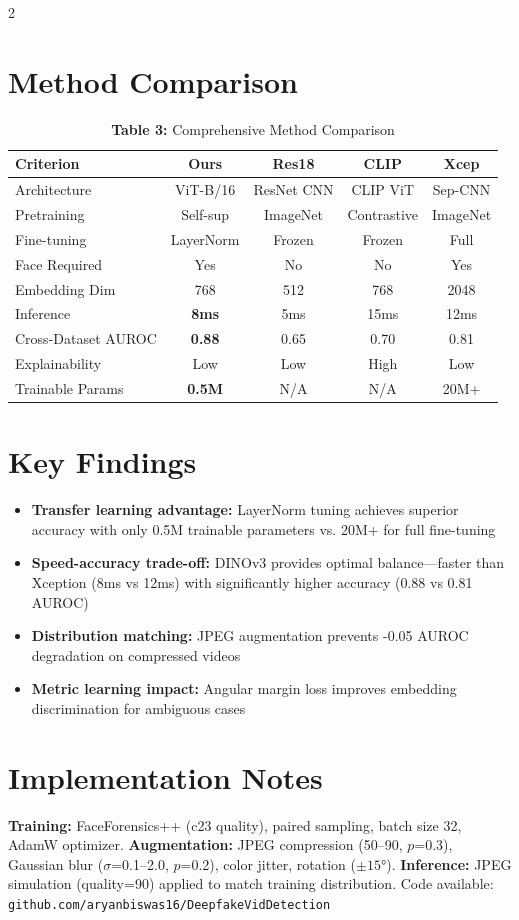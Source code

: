\documentclass[10pt,a4paper]{article}
\begin{document}
\begin{multicols}{2}
\section{Method Comparison}

\begin{table}[h]
\centering
\scriptsize
\caption*{\textbf{Table 3:} Comprehensive Method Comparison}
\begin{tabular}{@{}lcccc@{}}
\toprule
\textbf{Criterion} & \textbf{Ours} & \textbf{Res18} & \textbf{CLIP} & \textbf{Xcep} \\
\midrule
Architecture & ViT-B/16 & ResNet CNN & CLIP ViT & Sep-CNN \\
Pretraining & Self-sup & ImageNet & Contrastive & ImageNet \\
Fine-tuning & LayerNorm & Frozen & Frozen & Full \\
Face Required & Yes & No & No & Yes \\
Embedding Dim & 768 & 512 & 768 & 2048 \\
Inference & \textbf{8ms} & 5ms & 15ms & 12ms \\
Cross-Dataset AUROC & \textbf{0.88} & 0.65 & 0.70 & 0.81 \\
Explainability & Low & Low & High & Low \\
Trainable Params & \textbf{0.5M} & N/A & N/A & 20M+ \\
\bottomrule
\end{tabular}
\end{table}

\section{Key Findings}
\begin{itemize}[leftmargin=*,itemsep=1pt,topsep=2pt]
    \item \textbf{Transfer learning advantage:} LayerNorm tuning achieves superior accuracy with only 0.5M trainable parameters vs. 20M+ for full fine-tuning
    \item \textbf{Speed-accuracy trade-off:} DINOv3 provides optimal balance---faster than Xception (8ms vs 12ms) with significantly higher accuracy (0.88 vs 0.81 AUROC)
    \item \textbf{Distribution matching:} JPEG augmentation prevents -0.05 AUROC degradation on compressed videos
    \item \textbf{Metric learning impact:} Angular margin loss improves embedding discrimination for ambiguous cases
\end{itemize}

\section{Implementation Notes}
\textbf{Training:} FaceForensics++ (c23 quality), paired sampling, batch size 32, AdamW optimizer. \textbf{Augmentation:} JPEG compression (50--90, $p$=0.3), Gaussian blur ($\sigma$=0.1--2.0, $p$=0.2), color jitter, rotation ($\pm15°$). \textbf{Inference:} JPEG simulation (quality=90) applied to match training distribution. Code available: \texttt{github.com/aryanbiswas16/DeepfakeVidDetection}

\end{multicols}
\end{document}
